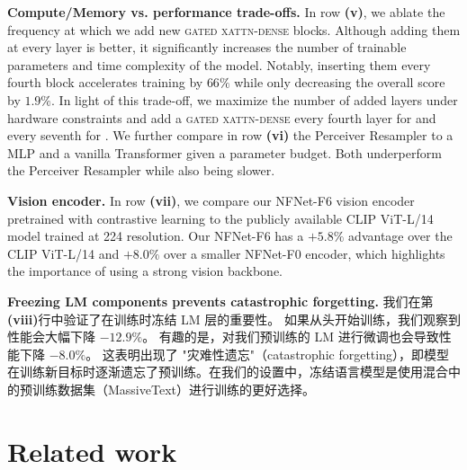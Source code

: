 \noindent
\textbf{Compute/Memory vs. performance trade-offs.}
In row \textbf{(v)}, we ablate the frequency at which we add new \textsc{gated xattn-dense} blocks.
Although adding them at every layer is better, it significantly increases the number of trainable parameters and time complexity of the model.
Notably, inserting them every fourth block accelerates training by $66\%$ while only decreasing the overall score by $1.9\%$.
In light of this trade-off, we maximize the number of added layers under hardware constraints and add a \textsc{gated xattn-dense} every fourth layer for \medium{} and every seventh for \largemfull{}.
We further compare in row \textbf{(vi)} the Perceiver Resampler to a MLP and a vanilla Transformer given a parameter budget.
Both underperform the Perceiver Resampler while also being slower.


\noindent
\textbf{Vision encoder.}
In row \textbf{(vii)}, we compare our NFNet-F6 vision encoder pretrained with contrastive learning  to the publicly available CLIP ViT-L/14~\citep{clip} model trained at 224 resolution.
Our NFNet-F6 has a $+5.8\%$ advantage over the CLIP ViT-L/14 and $+8.0\%$ over a smaller NFNet-F0 encoder, which highlights the importance of using a strong vision backbone.

\noindent
\textbf{Freezing LM components prevents catastrophic forgetting.} %
我们在第\textbf{(viii)}行中验证了在训练时冻结 LM 层的重要性。
如果从头开始训练，我们观察到性能会大幅下降 $-12.9\%$。
有趣的是，对我们预训练的 LM 进行微调也会导致性能下降 $-8.0\%$。
这表明出现了 "灾难性遗忘"（catastrophic forgetting），即模型在训练新目标时逐渐遗忘了预训练。在我们的设置中，冻结语言模型是使用混合中的预训练数据集（MassiveText）进行训练的更好选择。


\section{Related work}

